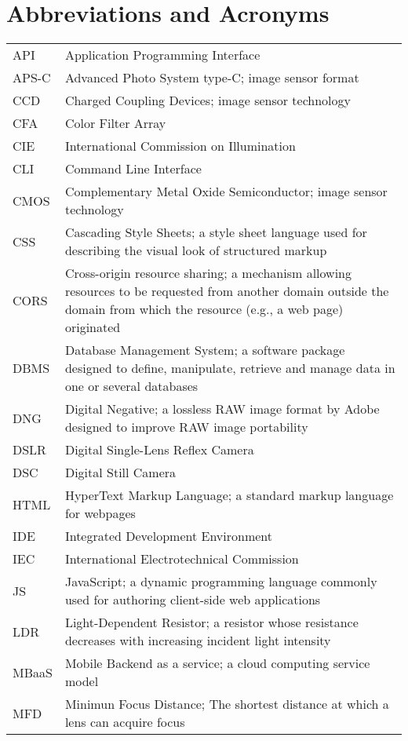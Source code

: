 \documentclass[thesis.tex]{subfiles}
\begin{document}
\chapter*{Abbreviations and Acronyms}

\noindent
\begin{longtable}{@{}p{}p{}@{}}
API & Application Programming Interface \\
APS-C & Advanced Photo System type-C; image sensor format \\
CCD & Charged Coupling Devices; image sensor technology \\
CFA & Color Filter Array \\
CIE & International Commission on Illumination \\
CLI & Command Line Interface \\
CMOS & Complementary Metal Oxide Semiconductor; image sensor technology \\
CSS & Cascading Style Sheets; a style sheet language used for describing the visual look of structured markup \\
CORS & Cross-origin resource sharing; a mechanism allowing resources to be requested from another domain outside the domain from which the resource (e.g., a web page) originated \\
DBMS & Database Management System; a software package designed to define, manipulate, retrieve and manage data in one or several databases \\
DNG & Digital Negative; a lossless RAW image format by Adobe designed to improve RAW image portability \\
DSLR & Digital Single-Lens Reflex Camera \\
DSC & Digital Still Camera \\
HTML & HyperText Markup Language; a standard markup language for webpages \\
IDE & Integrated Development Environment \\
IEC & International Electrotechnical Commission \\
JS & JavaScript; a dynamic programming language commonly used for authoring client-side web applications \\
LDR & Light-Dependent Resistor; a resistor whose resistance decreases with increasing incident light intensity \\
MBaaS & Mobile Backend as a service; a cloud computing service model \\
MFD & Minimun Focus Distance; The shortest distance at which a lens can acquire focus \\

\end{longtable}
\end{document}
